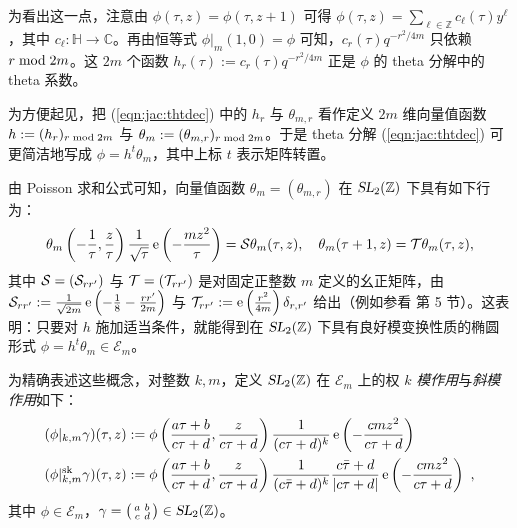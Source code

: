\documentclass[11pt,a4paper,fontset=windows]{ctexart}
\numberwithin{equation}{section}
\newcommand{\SL}{\operatorname{\textsl{SL}}}      %
\newcommand{\CC}{\mathbb{C}}
\newcommand{\HH}{\mathbb{H}}
\newcommand{\ZZ}{\mathbb{Z}}
\newcommand{\E}{\mathcal{E}}
\newcommand{\xmod}{{\rm \;mod\;}}
\def\c{\gamma}
\def\f{\phi}
\def\t{\tau}
\def\th{\theta}
\newcommand{\ex}{\operatorname{e}} %
\newcommand{\sk}{{\rm sk}}
\begin{document}

为看出这一点，注意由 $\phi(\tau,z)=\phi(\tau,z+1)$ 可得 $\phi(\tau,z)=\sum_{\ell \in\ZZ} c_\ell (\tau)y^\ell $，其中 $c_\ell :\HH\to\CC$。再由恒等式 $\phi|_m(1,0)=\phi$ 可知，$c_r(\tau)q^{-r^2/4m}$ 只依赖 $r\xmod 2m$。这 $2m$ 个函数 $h_r(\tau):=c_r(\tau)q^{-r^2/4m}$ 正是 $\phi$ 的 theta 分解中的 theta 系数。

为方便起见，把 (\ref{eqn:jac:thtdec}) 中的 $h_r$ 与 $\th_{m,r}$ 看作定义 $2m$ 维向量值函数 $h:=(h_r)_{r\xmod 2m}$ 与 $\th_m:=(\th_{m,r})_{r\xmod 2m}$。于是 theta 分解 (\ref{eqn:jac:thtdec}) 可更简洁地写成 $\phi=h^t\th_m$，其中上标 $t$ 表示矩阵转置。

由 Poisson 求和公式可知，向量值函数 $\th_{m}=(\th_{m,r})$ 在 $\SL_2(\ZZ)$ 下具有如下行为：
\begin{gather}\label{transf_theta}
\theta_m\left(-\frac1\tau,\frac{z}\tau\right)\frac{1}{\sqrt{\tau}}\ex\left(-\frac{mz^2}{\tau}\right)
=
{\cal S}\theta_m(\tau,z),\quad
\theta_{m}(\tau+1,z)
={\cal T}\theta_m(\tau,z),
\end{gather}
其中 ${\cal S}=({\cal S}_{rr'})$ 与 ${\cal T}=({\cal T}_{rr'})$ 是对固定正整数 $m$ 定义的幺正矩阵，由 ${\cal S}_{rr'}:=\frac1{\sqrt{2m}}\ex\left(-\frac{1}{8}-\frac{rr'}{2m}\right)$ 与 ${\cal T}_{rr'}:=\ex\left(\frac{r^2}{4m}\right)\delta_{r,r'}$ 给出（例如参看 \cite{eichler_zagier} 第 5 节）。这表明：只要对 $h$ 施加适当条件，就能得到在 $\SL_2(\ZZ)$ 下具有良好模变换性质的椭圆形式 $\f=h^t\theta_m\in\E_m$。


为精确表述这些概念，对整数 $k,m$，定义 $\SL_2(\ZZ)$ 在 $\E_m$ 上的权 $k$ {\em 模作用}与{\em 斜模作用}如下：
\begin{gather}\label{def:Jac_skewJac}
\begin{split}
(\f\lvert_{k,m}\gamma)(\t,z) &:= 
\f\left(\frac{a\t+b}{c\t+d},\frac{z}{c\t+d}\right)
\frac1{(c\t+d)^{{k}}} 
\ex\left(- \frac{c mz^2}{c\t+d}\right)
\\
(\f\lvert^\sk_{k,m}\gamma )(\t,z) &:= 
\f\left(\frac{a\t+b}{c\t+d},\frac{z}{c\t+d}\right)
\frac1{(c\bar\t+d)^{{k}}}\frac{c\bar\t+d}{|c\t+d|}
\ex\left(- \frac{c mz^2}{c\t+d}\right)~,
\end{split}
\end{gather} 
其中 $\f\in\E_m$，$\gamma=\left(\begin{smallmatrix} a&b\\c&d\end{smallmatrix}\right) \in \SL_2(\ZZ)$。
\end{document}
